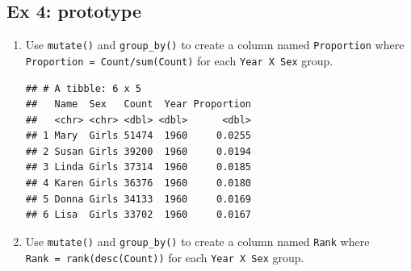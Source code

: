\documentclass[]{book}
\newenvironment{Shaded}{\begin{snugshade}}{\end{snugshade}}
\newcommand{\KeywordTok}[1]{\textcolor[rgb]{0.13,0.29,0.53}{\textbf{#1}}}
\newcommand{\DataTypeTok}[1]{\textcolor[rgb]{0.13,0.29,0.53}{#1}}
\newcommand{\StringTok}[1]{\textcolor[rgb]{0.31,0.60,0.02}{#1}}
\newcommand{\OperatorTok}[1]{\textcolor[rgb]{0.81,0.36,0.00}{\textbf{#1}}}
\newcommand{\NormalTok}[1]{#1}
\begin{document}
\subsection{Ex 4: prototype}\label{ex-4-prototype}

\begin{enumerate}
\def\labelenumi{\arabic{enumi}.}
\item
  Use \texttt{mutate()} and \texttt{group\_by()} to create a column
  named \texttt{Proportion} where
  \texttt{Proportion\ =\ Count/sum(Count)} for each
  \texttt{Year\ X\ Sex} group.

\begin{Shaded}
\end{Shaded}

\begin{verbatim}
## # A tibble: 6 x 5
##   Name  Sex   Count  Year Proportion
##   <chr> <chr> <dbl> <dbl>      <dbl>
## 1 Mary  Girls 51474  1960     0.0255
## 2 Susan Girls 39200  1960     0.0194
## 3 Linda Girls 37314  1960     0.0185
## 4 Karen Girls 36376  1960     0.0180
## 5 Donna Girls 34133  1960     0.0169
## 6 Lisa  Girls 33702  1960     0.0167
\end{verbatim}
\item
  Use \texttt{mutate()} and \texttt{group\_by()} to create a column
  named \texttt{Rank} where \texttt{Rank\ =\ rank(desc(Count))} for each
  \texttt{Year\ X\ Sex} group.

\begin{Shaded}
\end{Shaded}


\end{enumerate}
\end{document}
